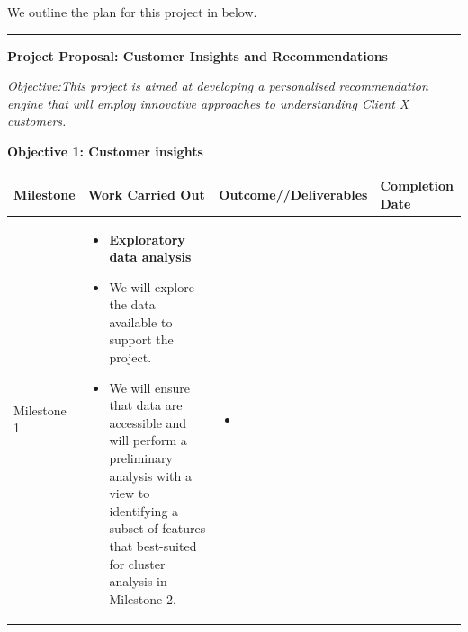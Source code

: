 \documentclass[]{book}
\providecommand{\tightlist}{%
  \setlength{\itemsep}{0pt}\setlength{\parskip}{0pt}}
\begin{document}
We outline the plan for this project in below.

\begin{center}\rule{0.5\linewidth}{0.5pt}\end{center}

\textbf{Project Proposal: Customer Insights and Recommendations}

\emph{Objective:This project is aimed at developing a personalised
recommendation engine that will employ innovative approaches to
understanding Client X customers.}

\textbf{Objective 1: Customer insights}

\begin{smaller}

\begin{longtable}[]{@{}llll@{}}
\toprule
\begin{minipage}[b]{0.14\columnwidth}\raggedright
Milestone\strut
\end{minipage} & \begin{minipage}[b]{0.30\columnwidth}\raggedright
Work Carried Out\strut
\end{minipage} & \begin{minipage}[b]{0.30\columnwidth}\raggedright
Outcome//Deliverables\strut
\end{minipage} & \begin{minipage}[b]{0.15\columnwidth}\raggedright
Completion Date\strut
\end{minipage}\tabularnewline
\midrule
\endhead
\begin{minipage}[t]{0.14\columnwidth}\raggedright
Milestone 1\strut
\end{minipage} & \begin{minipage}[t]{0.30\columnwidth}\raggedright
\begin{itemize}
\tightlist
\item
  \textbf{Exploratory data analysis}
\item
  We will explore the data available to support the project.
\item
  We will ensure that data are accessible and will perform a preliminary
  analysis with a view to identifying a subset of features that
  best-suited for cluster analysis in Milestone 2.
\end{itemize}\strut
\end{minipage} & \begin{minipage}[t]{0.30\columnwidth}\raggedright
\begin{itemize}
\tightlist
\item

\end{itemize}
\end{minipage}
\end{longtable}
\end{smaller}
\end{document}
